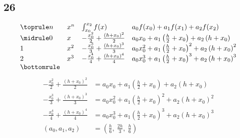 \documentclass{oisinclass}
\begin{document}
\subsection*{26}
\[
	\begin{array}{llll}
		\toprule
		n & x^n   & \int_{x_0}^{x_2}f(x)                                         & a_0f(x_0) + a_1f(x_1) +a_2f(x_2)                                                                \\
		\midrule
		0 & x     & - \frac{x_{0}^{2}}{2} + \frac{\left(h + x_{0}\right)^{2}}{2} & a_{0} x_{0} + a_{1} \left(\frac{h}{2} + x_{0}\right) + a_{2} \left(h + x_{0}\right)             \\
		1 & x^{2} & - \frac{x_{0}^{3}}{3} + \frac{\left(h + x_{0}\right)^{3}}{3} & a_{0} x_{0}^{2} + a_{1} \left(\frac{h}{2} + x_{0}\right)^{2} + a_{2} \left(h + x_{0}\right)^{2} \\
		2 & x^{3} & - \frac{x_{0}^{4}}{4} + \frac{\left(h + x_{0}\right)^{4}}{4} & a_{0} x_{0}^{3} + a_{1} \left(\frac{h}{2} + x_{0}\right)^{3} + a_{2} \left(h + x_{0}\right)^{3} \\
		\bottomrule
	\end{array}
\]
\begin{align*}
	- \frac{x_{0}^{2}}{2} + \frac{\left(h + x_{0}\right)^{2}}{2} & = a_{0} x_{0} + a_{1} \left(\frac{h}{2} + x_{0}\right) + a_{2} \left(h + x_{0}\right)             \\
	- \frac{x_{0}^{3}}{3} + \frac{\left(h + x_{0}\right)^{3}}{3} & = a_{0} x_{0}^{2} + a_{1} \left(\frac{h}{2} + x_{0}\right)^{2} + a_{2} \left(h + x_{0}\right)^{2} \\
	- \frac{x_{0}^{4}}{4} + \frac{\left(h + x_{0}\right)^{4}}{4} & = a_{0} x_{0}^{3} + a_{1} \left(\frac{h}{2} + x_{0}\right)^{3} + a_{2} \left(h + x_{0}\right)^{3} \\
	(a_0, a_1, a_2)                                              & = \left( \frac{h}{6}, \  \frac{2 h}{3}, \  \frac{h}{6}\right)
\end{align*}
\end{document}
